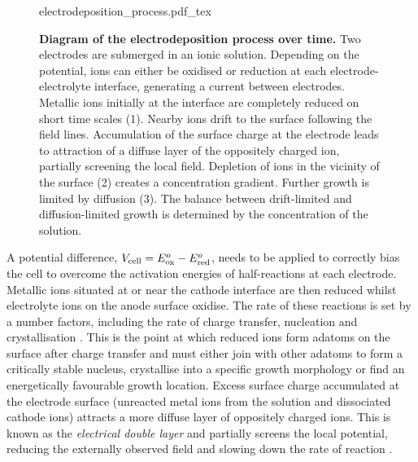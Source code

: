 \documentclass{article}
\begin{document}
\begin{figure}[bt]
{\fontsize{10pt}{1em}\selectfont \def\svgwidth{0.9\textwidth} {electrodeposition_process.pdf_tex}}
\caption[Diagram of the electrodeposition process over time.]{\textbf{Diagram of the electrodeposition process over time.} Two electrodes are submerged in an ionic solution. Depending on the potential, ions can either be oxidised or reduction at each electrode-electrolyte interface, generating a current between electrodes. Metallic ions initially at the interface are completely reduced on short time scales (1). Nearby ions drift to the surface following the field lines. Accumulation of the surface charge at the electrode leads to attraction of a diffuse layer of the oppositely charged ion, partially screening the local field. Depletion of ions in the vicinity of the surface (2) creates a concentration gradient. Further growth is limited by diffusion (3). The balance between drift-limited and diffusion-limited growth is determined by the concentration of the solution.}
\label{fig:electrodeposition_process}
\end{figure}

A potential difference, $V_{\mathrm{cell}} = E^o_{\mathrm{ox}}-E^o_{\mathrm{red}}$, needs to be applied to correctly bias the cell to overcome the activation energies of half-reactions at each electrode. Metallic ions situated at or near the cathode interface are then reduced whilst electrolyte ions on the anode surface oxidise. The rate of these reactions is set by a number factors, including the rate of charge transfer, nucleation and crystallisation \cite{paunovic2006fundamentals}. This is the point at which reduced ions form adatoms on the surface after charge transfer and must either join with other adatoms to form a critically stable nucleus, crystallise into a specific growth morphology or find an energetically favourable growth location. Excess surface charge accumulated at the electrode surface (unreacted metal ions from the solution and dissociated cathode ions) attracts a more diffuse layer of oppositely charged ions. This is known as the \textit{electrical double layer} and partially screens the local potential, reducing the externally observed field and slowing down the rate of reaction \cite{bard2001electrochemical}.
\end{document}

